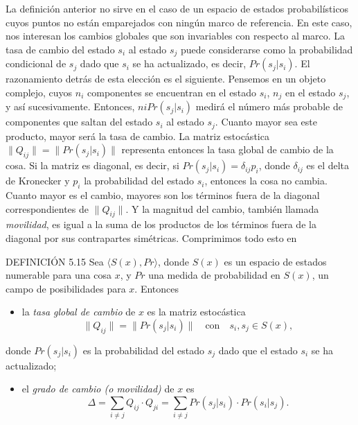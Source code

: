 \begin{justifying}
    La definición anterior no sirve en el caso de un espacio de estados probabilísticos 
    cuyos puntos no están emparejados con ningún marco de referencia. En este caso, nos interesan 
    los cambios globales que son invariables con respecto al marco. La tasa de cambio del estado $s_i$ 
    al estado $s_j$ puede considerarse como la probabilidad condicional de $s_j$ dado que $s_i$ se ha actualizado, 
    es decir, $Pr(s_j|s_i)$. El razonamiento detrás de esta elección es el siguiente. Pensemos en un objeto 
    complejo, cuyos $n_i$ componentes se encuentran en el estado $s_i$, $n_j$ en el estado $s_j$, y así sucesivamente. 
    Entonces, $niPr(s_j|s_i)$ medirá el número más probable de componentes que saltan del estado $s_i$ al estado $s_j$. 
    Cuanto mayor sea este producto, mayor será la tasa de cambio. La matriz estocástica $\lVert Q_{ij} \rVert = \lVert Pr(s_j|s_i) \rVert$
    representa entonces la tasa global de cambio de la cosa. Si la matriz es diagonal, es decir, si $Pr(s_j|s_i) = \delta _{ij}p_i$, 
    donde $\delta _{ij}$ es el delta de Kronecker y $p_i$ la probabilidad del estado $s_i$, entonces la cosa no cambia. Cuanto mayor es 
    el cambio, mayores son los términos fuera de la diagonal correspondientes de $\lVert Q_{ij} \rVert$. Y la magnitud del 
    cambio, también llamada \textit{movilidad}, es igual a la suma de los productos de los términos fuera de la diagonal 
    por sus contrapartes simétricas. Comprimimos todo esto en

    \noindent DEFINICIÓN 5.15 Sea $\langle S(x), Pr \rangle$, donde $S(x)$ es un espacio de estados numerable
    para una cosa $x$, y $Pr$ una medida de probabilidad en $S(x)$, un campo de posibilidades
    para $x$. Entonces 
    \begin{itemize}
        \item[(i)] la \textit{tasa global de cambio} de $x$ es la matriz estocástica
        \[
            \lVert Q_{ij}\rVert=\lVert Pr(s_j|s_i)\rVert \quad \text{con} \quad s_i,s_j\in S(x),
        \]
    \end{itemize}
    donde $Pr(s_j|s_i)$ es la probabilidad del estado $s_j$ dado que el estado $s_i$ se ha
    actualizado;
    \begin{itemize}   
        \item[(ii)] el \textit{grado de cambio (o movilidad)} de $x$ es
        \scriptsize
        \[
            \Delta = \sum_{i \ne j} Q_{ij} \cdot Q_{ji} = \sum_{i \ne j} Pr(s_j|s_i) \cdot Pr(s_i|s_j).
        \]
    \end{itemize} 


\end{justifying}
